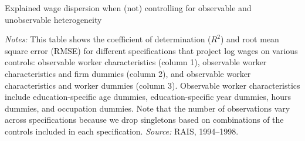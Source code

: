 \begin{table}[!htb]
  \centering
  \caption{Explained wage dispersion when (not) controlling for observable and unobservable heterogeneity\label{tab:edu_var_decomposition}}
  \pretabvspace
  
  \posttabvspace
  \begin{minipage}[t]{1\columnwidth}%
    \begin{spacing}{0.75}
      \emph{\scriptsize{}Notes:}{\scriptsize{} This table shows the coefficient of determination ($R^2$) and root mean square error (RMSE) for different specifications that project log wages on various controls: observable worker characteristics (column 1), observable worker characteristics and firm dummies (column 2), and observable worker characteristics and worker dummies (column 3). Observable worker characteristics include education-specific age dummies, education-specific year dummies, hours dummies, and occupation dummies. Note that the number of observations vary across specifications because we drop singletons based on combinations of the controls included in each specification.
      \emph{\scriptsize{}Source:} RAIS, 1994--1998.}
    \end{spacing}
  \end{minipage}
\end{table}
